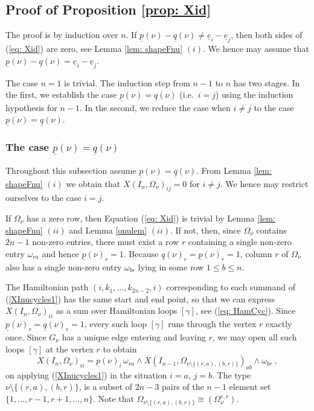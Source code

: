 \documentclass[10pt]{amsart}
\newcommand{\pp}{{\underline{p}}}
\newcommand{\qq}{{\underline{q}}}
\newcommand{\eee}{{\underline{e}}}
\theoremstyle{plain}
\newcommand{\0}{\color{blue}{\mathsf{0}}}
\begin{document}
\subsection{Proof of Proposition \ref{prop: Xid}}  The proof is by induction over $n$.
If $\pp(\nu)-\qq(\nu)\neq\eee_i-\eee_j$, then
both sides of (\ref{eq: Xid}) are zero, see Lemma \ref{lem: shapeFnu} $(i)$. We hence may assume that $\pp(\nu)-\qq(\nu)=\eee_i-\eee_j$.

The case $n=1$ is trivial. The induction step from $n-1$ to $n$ has two stages.
In the first, we establish   the case $\pp(\nu)=\qq(\nu)$ (i.e.\ $i=j$) using the induction hypothesis for $n-1.$ In the second, we reduce the case  when   $i\neq j$ to the case $\pp(\nu)=\qq(\nu)$.

\subsubsection{The case $\pp(\nu)=\qq(\nu)$} \label{sect: casepnuisqnu}
Throughout this subsection assume $\pp(\nu)=\qq(\nu)$.
From Lemma \ref{lem: shapeFnu} $(i)$ we obtain that
$X(I_n,\Omega_\nu)_{ij}=0$ for $i\neq j$. We hence may
restrict ourselves to the case $i=j$.

If $\Omega_\nu$ has a zero row, then Equation (\ref{eq: Xid}) is trivial by Lemma \ref{lem: shapeFnu} $(ii)$ and Lemma
\ref{onulem} $(ii)$.
If not, then, since  $\Omega_{\nu}$ contains $2n-1$ non-zero entries, there must
exist a row $r$  containing a single non-zero
entry $\omega_{ra}$ and hence $\pp(\nu)_r=1$.   Because $\qq(\nu)_r=\pp(\nu)_r=1$, column $r$ of $\Omega_\nu$ also has a single non-zero entry $\omega_{br}$ lying in  some  row $1\leq b \leq n$.

The Hamiltonian path $(i,k_1,\ldots, k_{2n-2}, i)$ corresponding to each summand of (\ref{XInucycles1}) has the same start and end point, so
that we can express $X(I_n,\Omega_\nu)_{ii}$ as a sum over  Hamiltonian
loops $[\gamma]$, see (\ref{eq: HamCyc}).
Since $\pp(\nu)_r=\qq(\nu)_r=1$, every such loop $[\gamma]$
runs through the vertex $r$  exactly once. Since $G_{\nu}$ has a unique edge entering and leaving $r$, we may open all such  loops  $[\gamma]$ at the
vertex $r$ to obtain 
$$
X(I_n,\Omega_\nu)_{ii}=\pp(\nu)_i\,\omega_{ra}\wedge X(I_{n-1},\Omega_{\nu\setminus\{(r,a),(b,r)\}})_{ab}\wedge\omega_{br}\ ,
$$
on applying (\ref{XInucycles1}) in the situation $i=a$, $j=b$. The type $\nu\setminus\{(r,a),(b,r)\}$, is  a subset of $2n-3$ pairs of the $n-1$ element set $\{1,\ldots, r-1,r+1,\ldots, n\}$. Note that $\Omega_{\nu\setminus\{(r,a),(b,r)\}}\cong  (\Omega_{\nu}^{r,r})$.
\end{document}
